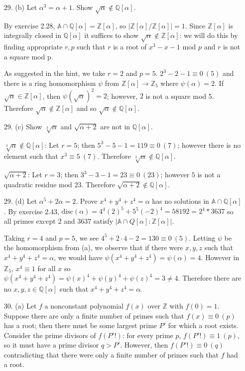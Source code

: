 \documentclass{article}
\newcommand{\Q}[0]{\mathbb{Q}}
\newcommand{\Z}[0]{\mathbb{Z}}
\newcommand{\disc}[1]{\text{disc}(#1)}
\newcommand{\modequiv}[3]{#1 \equiv #2\ (#3)}
\newcommand{\ringofintegers}[1]{\mathbb{A} \cap #1}
\begin{document}
\begin{enumerate}
\item[29. (b)] Let $\alpha^3 = \alpha + 1$.  Show $\sqrt{\alpha} \not\in \Q[\alpha]$.

    By exercise 2.28, $\ringofintegers{\Q[\alpha]} = \Z[\alpha]$, so $|\Z[\alpha]/\Z[\alpha]| = 1$.  Since $\Z[\alpha]$ is integrally closed in $\Q[\alpha]$ it suffices to show $\sqrt{\alpha} \not\in \Z[\alpha]$: we will do this by finding appropriate $r, p$ such that $r$ is a root of $x^3 - x - 1$ mod $p$ and $r$ is not a square mod p.

    As suggested in the hint, we take $r = 2$ and $p = 5$.  $2^3 - 2 - 1 \equiv 0\ (5)$ and there is a ring homomorphism $\psi$ from $\Z[\alpha] \to \Z_5$ where $\psi(\alpha) = 2$.  If $\sqrt{\alpha} \in \Z[\alpha]$, then $\psi(\sqrt{\alpha})^2 = 2$; however, $2$ is not a square mod 5.  Therefore $\sqrt{\alpha} \not\in \Z[\alpha]$ and so $\sqrt{\alpha} \not\in \Q[\alpha]$.

\item[29. (c)] Show $\sqrt[3]{\alpha}$ and $\sqrt{\alpha + 2}$ are not in $\Q[\alpha]$.

{\bf $\sqrt[3]{\alpha} \not\in \Q[\alpha]$}:  Let $r = 5$; then $5^3 - 5 - 1 = 119 \equiv 0\ (7)$; however there is no element such that $x^3 \equiv 5\ (7)$.  Therefore $\sqrt[3]{\alpha} \not\in \Q[\alpha]$.

{\bf $\sqrt{\alpha + 2}$}:  Let $r = 3$; then $3^3 - 3 - 1 = 23 \equiv 0\ (23)$; however $5$ is not a quadratic residue mod 23.  Therefore $\sqrt{\alpha + 2} \not\in \Q[\alpha]$.

\item[29. (d)] Let $\alpha^5 + 2\alpha = 2$.  Prove $x^4 + y^4 + z^4 = \alpha$ has no solutions in $\ringofintegers{\Q[\alpha]}$.  By exercise 2.43, $\disc{\alpha} = 4^4 (2)^5 + 5^5 (-2)^4 = 58192 = 2^4 * 3637$ so all primes except $2$ and $3637$ satisfy $|\ringofintegers{Q[\alpha]} : \Z[\alpha]|$.

Taking $r = 4$ and $p = 5$, we see $4^5 + 2\cdot 4 - 2 = 130 \equiv 0\ (5)$.  Letting $\psi$ be the homomorphism from (a), we observe that if there were $x, y, z$ such that $x^4 + y^4 + z^4 = \alpha$, we would have $\psi(x^4 + y^4 + z^4) = \psi(\alpha) = 4$.  However in $\Z_5$, $x^4 \equiv 1$ for all $x$ so $\psi(x^4 + y^4 + z^4) = \psi(x)^4 + \psi(y)^4 + \psi(z)^4 = 3 \neq 4$.  Therefore there are no $x, y, z \in \Q[\alpha]$ such that $x^4 + y^4 + z^4 = \alpha$.

\item[30. (a)] Let $f$ a nonconstant polynomial $f(x)$ over $\Z$ with $f(0) = 1$.  Suppose there are only a finite number of primes such that $\modequiv{f(x)}{0}{p}$ has a root; then there must be some largest prime $P'$ for which a root exists.  Consider the prime divisors of $f(P'!)$: for every prime $p$, $\modequiv{f(P'!)}{1}{p}$, so it must have a prime divisor $q > P'$.  However, then $\modequiv{f(P'!)}{0}{q}$ contradicting that there were only a finite number of primes such that $f$ had a root.


\end{enumerate}
\end{document}
